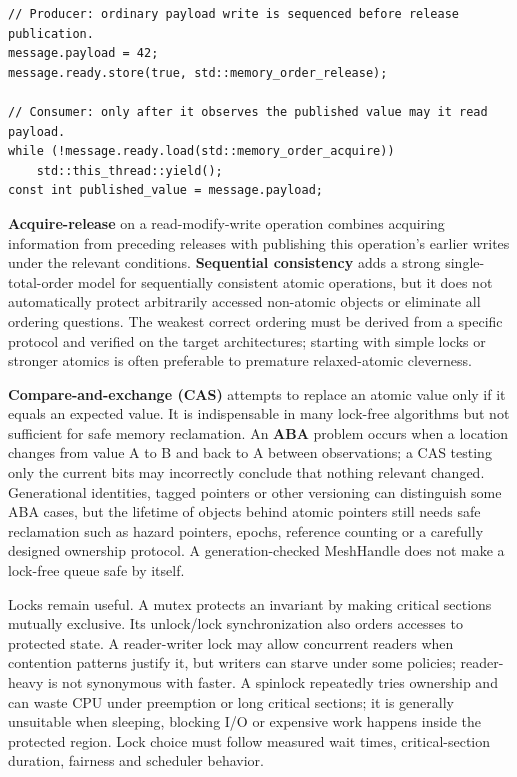 \begin{verbatim}
// Producer: ordinary payload write is sequenced before release publication.
message.payload = 42;
message.ready.store(true, std::memory_order_release);

// Consumer: only after it observes the published value may it read payload.
while (!message.ready.load(std::memory_order_acquire))
    std::this_thread::yield();
const int published_value = message.payload;
\end{verbatim}

\textbf{Acquire-release} on a read-modify-write operation combines acquiring information from preceding releases with publishing this operation's earlier writes under the relevant conditions. \textbf{Sequential consistency} adds a strong single-total-order model for sequentially consistent atomic operations, but it does not automatically protect arbitrarily accessed non-atomic objects or eliminate all ordering questions. The weakest correct ordering must be derived from a specific protocol and verified on the target architectures; starting with simple locks or stronger atomics is often preferable to premature relaxed-atomic cleverness.

\textbf{Compare-and-exchange (CAS)} attempts to replace an atomic value only if it equals an expected value. It is indispensable in many lock-free algorithms but not sufficient for safe memory reclamation. An \textbf{ABA} problem occurs when a location changes from value A to B and back to A between observations; a CAS testing only the current bits may incorrectly conclude that nothing relevant changed. Generational identities, tagged pointers or other versioning can distinguish some ABA cases, but the lifetime of objects behind atomic pointers still needs safe reclamation such as hazard pointers, epochs, reference counting or a carefully designed ownership protocol. A generation-checked MeshHandle does not make a lock-free queue safe by itself.

Locks remain useful. A mutex protects an invariant by making critical sections mutually exclusive. Its unlock/lock synchronization also orders accesses to protected state. A reader-writer lock may allow concurrent readers when contention patterns justify it, but writers can starve under some policies; reader-heavy is not synonymous with faster. A spinlock repeatedly tries ownership and can waste CPU under preemption or long critical sections; it is generally unsuitable when sleeping, blocking I/O or expensive work happens inside the protected region. Lock choice must follow measured wait times, critical-section duration, fairness and scheduler behavior.

